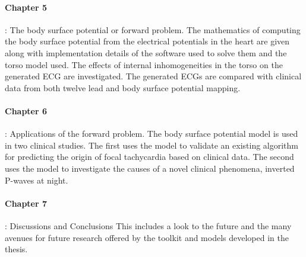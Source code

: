 \paragraph{Chapter 5}: The body surface potential or forward problem.
The mathematics of computing the body surface potential from the electrical
potentials in the heart are given along with implementation details of the
software used to solve them and the torso model used.
The effects of internal inhomogeneities in the torso on the generated ECG are
investigated.
The generated ECGs are compared with clinical data from both twelve lead and
body surface potential mapping.

\paragraph{Chapter 6}: Applications of the forward problem.
The body surface potential model is used in two clinical studies.
The first uses the model to validate an existing algorithm for predicting the
origin of focal tachycardia based on clinical data.
The second uses the model to investigate the causes of a novel clinical
phenomena, inverted P-waves at night.

\paragraph{Chapter 7}: Discussions and Conclusions
This includes a look to the future and the many avenues for future research
offered by the toolkit and models developed in the thesis.

